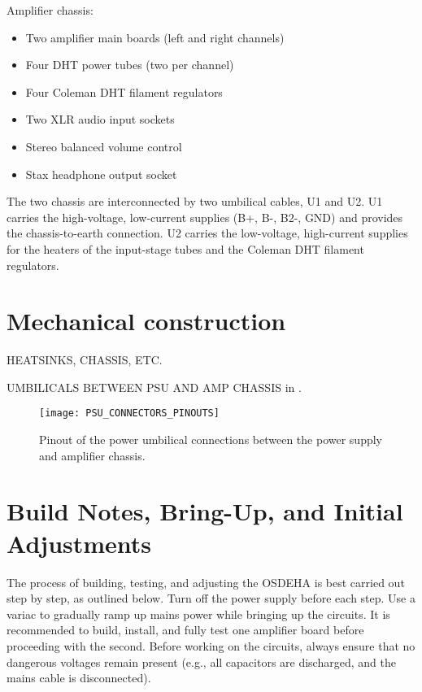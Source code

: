 Amplifier chassis:
\begin{itemize}
\item Two amplifier main boards (left and right channels)
\item Four DHT power tubes (two per channel)
\item Four Coleman DHT filament regulators
\item Two XLR audio input sockets
\item Stereo balanced volume control
\item Stax headphone output socket
\end{itemize}

The two chassis are interconnected by two umbilical cables, U1 and U2. U1 carries the high-voltage, low-current supplies (B+, B-, B2-, GND) and provides the chassis-to-earth connection. U2 carries the low-voltage, high-current supplies for the heaters of the input-stage tubes and the Coleman DHT filament regulators.


\section{Mechanical construction}

HEATSINKS, CHASSIS, ETC.

UMBILICALS BETWEEN PSU AND AMP CHASSIS in .

\begin{figure}
\begin{center}
\texttt{[image: PSU\_CONNECTORS\_PINOUTS]}
\caption{Pinout of the power umbilical connections between the power supply and amplifier chassis.}
\end{center}
\end{figure}


\section{Build Notes, Bring-Up, and Initial Adjustments}

The process of building, testing, and adjusting the OSDEHA is best carried out step by step, as outlined below. Turn off the power supply before each step. Use a variac to gradually ramp up mains power while bringing up the circuits. It is recommended to build, install, and fully test one amplifier board before proceeding with the second. Before working on the circuits, always ensure that no dangerous voltages remain present (e.g., all capacitors are discharged, and the mains cable is disconnected).

